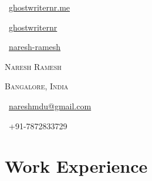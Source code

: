 \documentclass[a4paper,10pt]{extarticle} %
\begin{document}
\pagestyle{empty} %


\begin{center}
\begin{minipage}[b]{0.33333\textwidth}
\raggedright
\faGlobe\ {\href{https://ghostwriternr.me/}{ghostwriternr.me}}\par
\faGithub\ {\href{https://github.com/ghostwriternr}{ghostwriternr}}\par
\faLinkedinSquare\ {\href{https://www.linkedin.com/in/naresh-ramesh}{naresh-ramesh}} 
\end{minipage}%
\begin{minipage}[b]{0.33333\textwidth}
\centering
\Huge\textsc{\textcolor{primary}{Naresh} Ramesh}\par
\normalsize{\textsc{Bangalore, India}}
\end{minipage}%
\begin{minipage}[b]{0.33333\textwidth}
\raggedleft
\normalsize\faEnvelope\ {\href{mailto:nareshmdu@gmail.com}{nareshmdu@gmail.com}}\par
\faPhone\ +91-7872833729\par
\phantom{ }
\end{minipage}
\end{center}


\section{\textcolor{primary}{Work Experience}}
\end{document}
